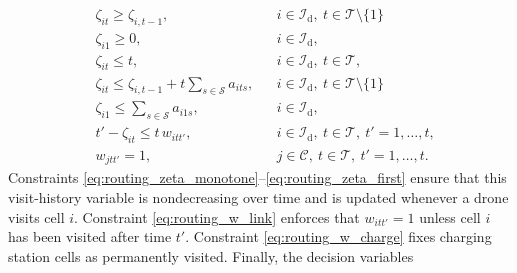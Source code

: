 \documentclass[pdflatex,sn-mathphys-num]{sn-jnl}%
\theoremstyle{thmstyleone}%
\theoremstyle{thmstyletwo}%
\theoremstyle{thmstylethree}%
\newcommand{\set}[1]{\mathcal{#1}}
\begin{document}
\begin{align}
& \zeta_{it} \ge \zeta_{i,t-1},
&& i \in \set I_{\text{d}},\ t \in \set T \setminus \{1\}
\label{eq:routing_zeta_monotone}
\\
& \zeta_{i1} \ge 0,
&& i \in \set I_{\text{d}},
\label{eq:routing_zeta_init_lb}
\\
& \zeta_{it} \le t,
&& i \in \set I_{\text{d}},\ t \in \mathcal{T},
\label{eq:routing_zeta_time}
\\
& \zeta_{it}
\le
\zeta_{i,t-1}
+
t\sum_{s\in\mathcal S} a_{its},
&& i \in \set I_{\text{d}},\ t \in \set T \setminus \{1\}
\label{eq:routing_zeta_visit}
\\
& \zeta_{i1}
\le
\sum_{s\in\mathcal S} a_{i1s},
&& i \in \set I_{\text{d}},
\label{eq:routing_zeta_first}
\\
& t' - \zeta_{it} \le t\, w_{itt'},
&& i \in \set I_{\text{d}},\ t \in \mathcal{T},\ t'=1,\dots,t,
\label{eq:routing_w_link}
\\
& w_{jtt'} = 1,
&& j \in \mathcal{C},\ t \in \mathcal{T},\ t'=1,\dots,t.
\label{eq:routing_w_charge}
\end{align}
Constraints \eqref{eq:routing_zeta_monotone}--\eqref{eq:routing_zeta_first} ensure that this visit-history variable is nondecreasing over time and is updated whenever a drone visits cell \(i\). 
Constraint \eqref{eq:routing_w_link} enforces that \(w_{itt'}=1\) unless cell \(i\) has been visited after time \(t'\). Constraint \eqref{eq:routing_w_charge} fixes charging station cells as permanently visited. Finally, the decision variables 
\end{document}
